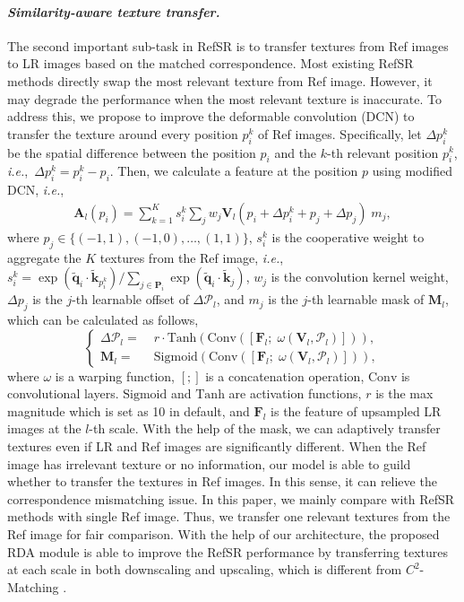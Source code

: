 \documentclass[runningheads]{llncs}
\def\ie{\mbox{\textit{i.e.}, }}
\def\mP{{\mathcal P}}
\def\bA{{\bm{A}}}
\def\bF{{\bm{F}}}
\def\bM{{\bm{M}}}
\def\bP{{\bm{P}}}
\def\bV{{\bm{V}}}
\def\bk{{\bm k}}
\def\bq{{\bm q}}
\def\Sigmoid{{\mathrm{Sigmoid}}}
\def\Conv{{\mathrm{Conv}}}
\def\Tanh{{\mathrm{Tanh}}}
\begin{document}
\paragraph{\textbf{\emph{Similarity-aware texture transfer.}}}
The second important sub-task in RefSR is to transfer textures from Ref images to LR images based on the matched correspondence.
Most existing RefSR methods \cite{zhang2019image,yang2020learning} directly swap the most relevant texture from Ref image.
However, it may degrade the performance when the most relevant texture is inaccurate. 
To address this, we propose to improve the deformable convolution (DCN) \cite{dai2017deformable,zhu2019deformable} to transfer the texture around every position $p_i^k$ of Ref images. 
Specifically, let $\Delta p_i^k$ be the spatial difference between the position $p_i$ and the $k$-th relevant position $p_i^k$, \ie $\Delta p_i^k = p_i^k - p_i$.
Then, we calculate a feature at the position $p$ using modified DCN, \ie
\begin{align}
    \bA_l(p_i) = \sum\nolimits_{k=1}^K s_i^k \sum\nolimits_{j} w_j \bV_l(p_i + \Delta p_i^k + p_j + \Delta p_j)\; m_j,
\end{align}
where $p_j \in \{ (-1, 1), (-1, 0), \ldots, (1, 1) \}$, $s_i^k$ is the cooperative weight to aggregate the $K$ textures from the Ref image, \ie $s_i^k = {\exp({ \widetilde{\bq}_i \cdot \widetilde{\bk}_{p_i^k} })} / {\sum\nolimits_{j \in \bP_i} \exp ({\widetilde{\bq}_i \cdot \widetilde{\bk}_j })} $, $w_j$ is the convolution kernel weight, $\Delta p_j$ is the $j$-th learnable offset of $\Delta \mP_l$, and $m_j$ is the $j$-th learnable mask of $\bM_l$, which can be calculated as follows,
\begin{equation}
\left\{
\begin{aligned}
    \Delta \mP_l =\;& r \cdot \Tanh\left(\Conv([\bF_l;\; \omega(\bV_l, \mP_l)])\right), \\
    \bM_l =\;& \Sigmoid \left(\Conv([\bF_l;\; \omega(\bV_l, \mP_l)]) \right),
\end{aligned}
\right.
\end{equation}
where $\omega$ is a warping function, $[;]$ is a concatenation operation, $\Conv$ is convolutional layers.
$\Sigmoid$ and $\Tanh$ are activation functions, $r$ is the max magnitude which is set as 10 in default, and $\bF_l$ is the feature of upsampled LR images at the $l$-th scale. 
With the help of the mask, we can adaptively transfer textures even if LR and Ref images are significantly different.  
When the Ref image has irrelevant texture or no information, our model is able to guild whether to transfer the textures in Ref images. 
In this sense, it can relieve the correspondence mismatching issue. 
In this paper, we mainly compare with RefSR methods with single Ref image.
Thus, we transfer one relevant textures from the Ref image for fair comparison.
With the help of our architecture, the proposed RDA module is able to improve the RefSR performance by transferring textures at each scale in both downscaling and upscaling, which is different from $C^2$-Matching \cite{jiang2021robust}.
\end{document}
